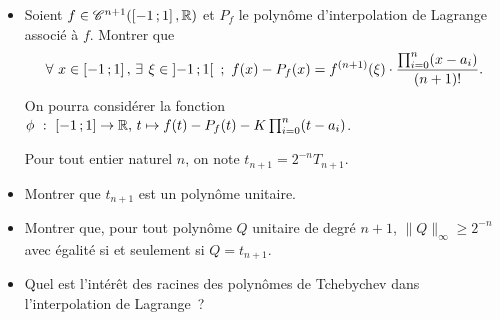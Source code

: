 \begin{itemize}
\item Soient $f \in \mathscr{C}^{n+1}(\left[-1\,;1\right],\mathbb{R})$ et $P_f$ le polynôme d'interpolation de Lagrange associé à $f$. Montrer que
\[
\forall\, x\in \interff{-1}{1},\, \exists\, \xi \in \interoo{-1}{1} ~;~
f(x) - P_f(x) =  f^{(n+1)}(\xi) \cdot \frac{\prod_{i=0}^n (x-a_i)}{(n+1)!}.
\]
{\footnotesize On pourra considérer la fonction $\phi~:~\left[-1\,;1\right] \to \mathbb{R},\, t \mapsto  f(t) - P_f(t) - K \prod_{i=0}^n (t-a_i)$.
}

\medskip

Pour tout entier naturel $n$, on note $t_{n+1} = 2^{-n} T_{n+1}$.
\item Montrer que $t_{n+1}$ est un polynôme unitaire.

\item Montrer que, pour tout polynôme $Q$ unitaire de degré $n+1$, $\|Q\|_\infty \geq 2^{-n}$ avec égalité si et seulement si $Q = t_{n+1}$.

\item Quel est l'intérêt des racines des polynômes de Tchebychev dans l'interpolation de Lagrange~?
\end{itemize}


